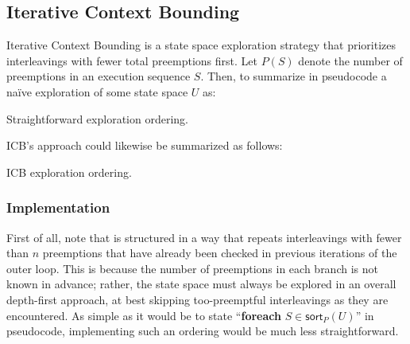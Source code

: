\subsection{Iterative Context Bounding}
\label{sec:landslide-icb}

Iterative Context Bounding \cite{chess-icb} is a state space exploration strategy
that prioritizes interleavings with fewer total preemptions first.
Let $P(S)$ denote the number of preemptions in an execution sequence $S$.
Then, to summarize in pseudocode a na\"ive exploration of some state space $U$ as:

\begin{algorithm}[h]
	\caption{Straightforward exploration ordering.}
	\label{alg:not-icb}
\end{algorithm}

ICB's approach could likewise be summarized as follows:

\begin{algorithm}[h]
	\caption{ICB exploration ordering.}
	\label{alg:icb}
\end{algorithm}


\subsubsection{Implementation}

First of all, note that  is structured in a way that repeats interleavings
with fewer than $n$ preemptions that have already been checked in previous iterations of the outer loop.
This is because the number of preemptions in each branch is not known in advance;
rather, the state space must always be explored in an overall depth-first approach,
at best skipping too-preemptful interleavings as they are encountered.
As simple as it would be to state ``{\bf foreach} $S \in {\mathsf{sort}_P(U)}$'' in pseudocode,
implementing such an ordering would be much less straightforward. %

